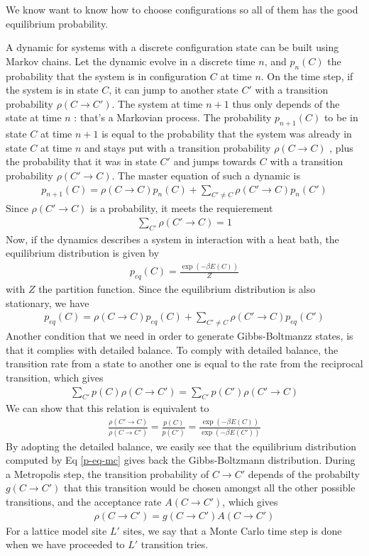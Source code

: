 We know want to know how to choose configurations so all of them has the good equilibrium probability.

A dynamic for systems with a discrete configuration state can be built using Markov chains. Let the dynamic evolve in a discrete time $n$, and $p_n(C)$ the probability that the system is in configuration $C$ at time $n$. On the time step, if the system is in state $C$, it can jump to another state $C'$ with a transition probability $\rho(C\to C')$. The system at time $n+1$ thus only depends of the state at time $n$ : that's a Markovian process. The probability $p_{n+1}(C)$ to be in state $C$ at time $n+1$ is equal to the probability that the system was already in state $C$ at time $n$ and stays put with a transition probability $\rho(C\to C)$ , plus the probability that it was in state $C'$ and jumps towards $C$ with a transition probability $\rho(C'\to C)$. The master equation of such a dynamic is
\begin{align}
    p_{n+1}(C) =  \rho(C\to C) p_n(C) + \sum_{C'\neq C} \rho(C'\to C) p_n(C')
\end{align}
Since $\rho(C' \to C)$ is a probability, it meets the requierement 
\begin{align}
    \sum_{C'} \rho(C' \to C) = 1
    \label{norm}
\end{align}
Now, if the dynamics describes a system in interaction with a heat bath, the equilibrium distribution is given by
\begin{align}
    p_{eq}(C) = \frac{\exp(-\beta E(C))}{Z}
\end{align}
with $Z$ the partition function. Since the equilibrium distribution is also stationary, we have
\begin{align}
    p_{eq}(C) =  \rho(C\to C) p_{eq}(C) + \sum_{C'\neq C} \rho(C'\to C)p_{eq}(C')
    \label{p-eq-mc}
\end{align}
Another condition that we need in order to generate Gibbs-Boltmanzz states, is that it complies with detailed balance. To comply with detailed balance, the transition rate from a state to another one is equal to the rate from the reciprocal transition, which gives
\begin{align}
    \sum_{C'} p(C) \rho(C \to C') = \sum_{C'} p(C') \rho(C' \to C)
\end{align}
We can show that this relation is equivalent to \cite{newman_monte_1999} 
\begin{align}
    \frac{\rho(C'\to C)}{\rho(C \to C')} = \frac{p(C)}{p(C')} = \frac{\exp(-\beta E(C))}{\exp(-\beta E(C'))}
\end{align} 
By adopting the detailed balance, we easily see that the equilibrium distribution computed by Eq \eqref{p-eq-mc} gives back the Gibbs-Boltzmann distribution. 
During a Metropolis step, the transition probability of $C\to C'$ depends of the probabilty $g(C\to C')$ that this transition would be chosen amongst all the other possible transitions, and the acceptance rate $A(C \to C')$, which gives
\begin{align}
    \rho(C\to C') = g(C\to C') A(C \to C')
\end{align}
For a lattice model site $L'$ sites, we say that a Monte Carlo time step is done when we have proceeded to $L'$ transition tries.
